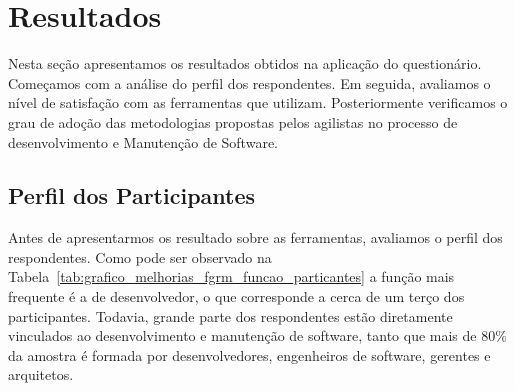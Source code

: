 





\section{Resultados}
\label{sec:analise_dados}

Nesta seção apresentamos os resultados obtidos na aplicação do questionário.
Começamos com a análise do perfil dos respondentes. Em seguida, avaliamos o
nível de satisfação com as ferramentas que utilizam. Posteriormente verificamos
o grau de adoção das metodologias propostas pelos agilistas no processo de
desenvolvimento e Manutenção de Software.

\subsection{Perfil dos Participantes}
\label{sub:pesquisa_prof_perfil_dos_participantes}

Antes de apresentarmos os resultado sobre as ferramentas, avaliamos o perfil dos
respondentes. Como pode ser observado na
Tabela~\ref{tab:grafico_melhorias_fgrm_funcao_particantes} a função mais
frequente é a de desenvolvedor, o que corresponde a cerca de um terço dos
participantes. Todavia, grande parte dos respondentes estão diretamente
vinculados ao desenvolvimento e manutenção de software, tanto que mais de 80\%
da amostra é formada por desenvolvedores, engenheiros de software, gerentes e
arquitetos.

